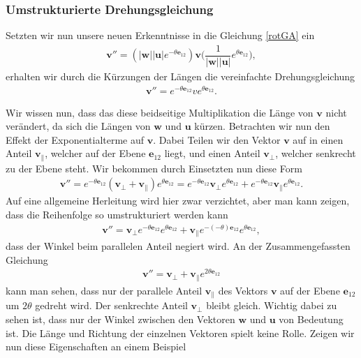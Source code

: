 \subsubsection{Umstrukturierte Drehungsgleichung}
Setzten wir nun unsere neuen Erkenntnisse in die Gleichung \eqref{rotGA} ein
\begin{align}
	\mathbf{v''} = (|\mathbf{w}||\mathbf{u}|e^{-\theta \mathbf{e}_{12}})\mathbf{v}\biggl(\dfrac{1}{|\mathbf{w}||\mathbf{u}|}e^{\theta \mathbf{e}_{12}}\biggr),
\end{align}
erhalten wir durch die Kürzungen der Längen die vereinfachte Drehungsgleichung
\begin{align}
	\mathbf{v''} = e^{-\theta \mathbf{e}_{12}} v e^{\theta \mathbf{e}_{12}}.
\end{align}

Wir wissen nun, dass das diese beidseitige Multiplikation die Länge von $\mathbf{v}$ nicht verändert, da sich die Längen von $\mathbf{w}$ und $\mathbf{u}$ kürzen. Betrachten wir nun den Effekt der Exponentialterme auf $\mathbf{v}$. Dabei Teilen wir den Vektor $\mathbf{v}$ auf in einen Anteil $\mathbf{v_\parallel}$, welcher auf der Ebene $\mathbf{e}_{12}$ liegt, und einen Anteil $\mathbf{v_\perp}$, welcher senkrecht zu der Ebene steht. Wir bekommen durch Einsetzten nun diese Form
\begin{align} \label{RotAufPerpPar}
	\mathbf{v}'' = e^{-\theta \mathbf{e}_{12}} (\mathbf{v_\perp + v_\parallel}) e^{\theta \mathbf{e}_{12}} = e^{-\theta \mathbf{e}_{12}} \mathbf{v_\perp} e^{\theta \mathbf{e}_{12}} + e^{-\theta \mathbf{e}_{12}} \mathbf{v_\parallel} e^{\theta \mathbf{e}_{12}}.
\end{align}
Auf eine allgemeine Herleitung wird hier zwar verzichtet, aber man kann zeigen, dass die Reihenfolge so umstrukturiert werden kann
\begin{align}
	\mathbf{v}'' = \mathbf{v_\perp} e^{-\theta \mathbf{e}_{12}}  e^{\theta \mathbf{e}_{12}} +  \mathbf{v_\parallel} e^{-(-\theta) \mathbf{e}_{12}} e^{\theta \mathbf{e}_{12}},
\end{align}
dass der Winkel beim parallelen Anteil negiert wird. An der Zusammengefassten Gleichung
\begin{align}\label{RotParPerp}
	\mathbf{v}'' = \mathbf{v_\perp} +  \mathbf{v_\parallel} e^{2\theta \mathbf{e}_{12}}
\end{align}
kann man sehen, dass nur der parallele Anteil $\mathbf{v_\parallel}$ des Vektors $\mathbf{v}$ auf der Ebene $\mathbf{e}_{12}$ um $2\theta$ gedreht wird. Der senkrechte Anteil $\mathbf{v_\perp}$ bleibt gleich. Wichtig dabei zu sehen ist, dass nur der Winkel zwischen den Vektoren $\mathbf{w}$ und $\mathbf{u}$ von Bedeutung ist. Die Länge und Richtung der einzelnen Vektoren spielt keine Rolle. Zeigen wir nun diese Eigenschaften an einem Beispiel
